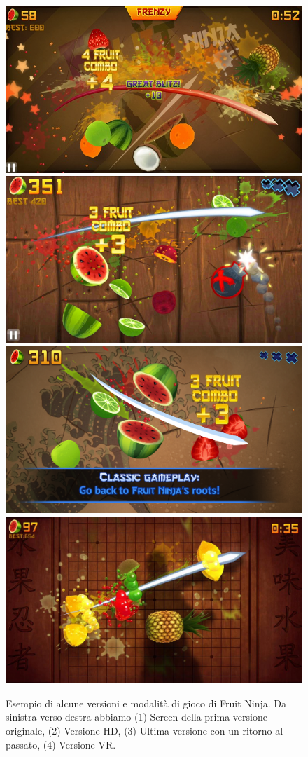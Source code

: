 \begin{figure}[!htp]
	\centering
	\includegraphics[width=0.49\linewidth]{images/ch10/4} \hfill
	\includegraphics[width=0.49\linewidth]{images/ch10/1}
	\\[0.15cm]
	\includegraphics[width=0.49\linewidth]{images/ch10/2} \hfill
	\includegraphics[width=0.49\linewidth]{images/ch10/3}	
	
	\caption{Esempio di alcune versioni e modalità di gioco di Fruit Ninja. Da sinistra verso destra abbiamo (1) Screen della prima versione originale, (2) Versione HD, (3) Ultima versione con un ritorno al passato, (4) Versione VR. }
\end{figure}

